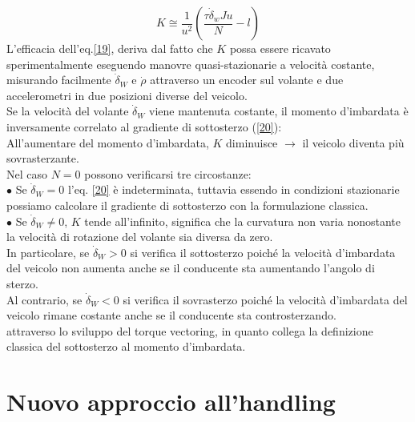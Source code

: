 \begin{equation} \label{20}
    K \cong \frac{1}{u^2} \left( \frac{\tau \dot{\delta}_wJu}{N} - l \right)
\end{equation}
L'efficacia dell'eq.\ref{19}, deriva dal fatto che $K$ possa essere ricavato sperimentalmente eseguendo manovre quasi-stazionarie a velocità costante, misurando facilmente $\dot{\delta}_W$ e $\dot{\rho}$ attraverso un encoder sul volante e due accelerometri in due posizioni diverse del veicolo. \\
Se la velocità del volante $\dot{\delta}_W$ viene mantenuta costante, il momento d'imbardata è inversamente correlato al gradiente di sottosterzo (\ref{20}):\\ 
All'aumentare del momento d'imbardata, $K$ diminuisce $\xrightarrow{}$ il veicolo diventa più sovrasterzante.\\
Nel caso $N = 0$ possono verificarsi tre circostanze:\\ 
$\bullet$ Se $\dot{\delta}_W = 0$ l'eq. \ref{20} è indeterminata, tuttavia essendo in condizioni stazionarie possiamo calcolare il gradiente di sottosterzo con la formulazione classica.\\
$\bullet$ Se $\dot{\delta}_W \neq 0$, $K$ tende all'infinito, significa che la curvatura non varia nonostante la velocità di rotazione del volante sia diversa da zero.\\
In particolare,
se $\dot{\delta}_W > 0$ si verifica il sottosterzo poiché la velocità d'imbardata del veicolo non aumenta anche se il conducente sta aumentando l'angolo di sterzo.\\ 
Al contrario, se $\dot{\delta}_W < 0$ si verifica il sovrasterzo poiché la velocità d'imbardata del veicolo rimane costante anche se il conducente sta controsterzando.\\
attraverso lo sviluppo del torque vectoring, 
in quanto collega la definizione classica del sottosterzo al momento d'imbardata.
\section{Nuovo approccio all'handling}

